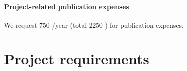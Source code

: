 \documentclass[10pt,fleqn,twoside]{article}
\begin{document}




\paragraph{Project-related publication expenses}

We request 750 \EUR{}/year (total 2250 \EUR{}) for publication expenses.







% 
% 
% 
% 
% 
% 
% 

\section{Project requirements}
\renewcommand{\leftmark}{\sc Project requirements}
\end{document}
